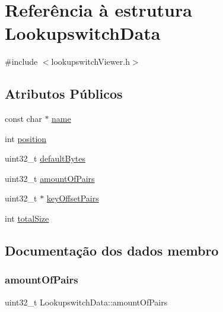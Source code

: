 \hypertarget{struct_lookupswitch_data}{}\section{Referência à estrutura Lookupswitch\+Data}
\label{struct_lookupswitch_data}


{\ttfamily \#include $<$lookupswitch\+Viewer.\+h$>$}

\subsection*{Atributos Públicos}
\begin{DoxyCompactItemize}
\item 
const char $\ast$ \hyperlink{struct_lookupswitch_data_aa7422f01abbe6a3c7274eb3814070ff2}{name}
\item 
int \hyperlink{struct_lookupswitch_data_a5d0ee67c83b73f23e3f545bbd98b1aa6}{position}
\item 
uint32\+\_\+t \hyperlink{struct_lookupswitch_data_ad2243f8f3bfa13ee68419fddaca0b5fb}{default\+Bytes}
\item 
uint32\+\_\+t \hyperlink{struct_lookupswitch_data_aa7accb6305b559b34a2caa27896896dd}{amount\+Of\+Pairs}
\item 
uint32\+\_\+t $\ast$ \hyperlink{struct_lookupswitch_data_a47c2e5ea4d79b8f5fa1b92ab2280bb22}{key\+Offset\+Pairs}
\item 
int \hyperlink{struct_lookupswitch_data_ac65eda1cf7fd0950f65f468dc78b4133}{total\+Size}
\end{DoxyCompactItemize}


\subsection{Documentação dos dados membro}
\hypertarget{struct_lookupswitch_data_aa7accb6305b559b34a2caa27896896dd}{}\label{struct_lookupswitch_data_aa7accb6305b559b34a2caa27896896dd} 
\subsubsection{\texorpdfstring{amount\+Of\+Pairs}{amountOfPairs}}
{\footnotesize\ttfamily uint32\+\_\+t Lookupswitch\+Data\+::amount\+Of\+Pairs}

\hypertarget{struct_lookupswitch_data_ad2243f8f3bfa13ee68419fddaca0b5fb}{}\label{struct_lookupswitch_data_ad2243f8f3bfa13ee68419fddaca0b5fb} 
